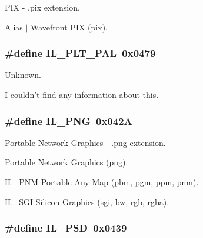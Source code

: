 P\+I\+X -\/ .pix extension. 

Alias $\vert$ Wavefront P\+I\+X (pix). \hypertarget{group__il__formats_ga2369e5911ab069d0ea3dac1ce50e9ce5}{
\subsubsection[{I\+L\+\_\+\+P\+L\+T\+\_\+\+P\+A\+L}]{\setlength{\rightskip}{0pt plus 5cm}\#define I\+L\+\_\+\+P\+L\+T\+\_\+\+P\+A\+L~0x0479}}\label{group__il__formats_ga2369e5911ab069d0ea3dac1ce50e9ce5}


Unknown. 

I couldn't find any information about this. \hypertarget{group__il__formats_ga44006e952eb70685efdb82059eca4386}{
\subsubsection[{I\+L\+\_\+\+P\+N\+G}]{\setlength{\rightskip}{0pt plus 5cm}\#define I\+L\+\_\+\+P\+N\+G~0x042\+A}}\label{group__il__formats_ga44006e952eb70685efdb82059eca4386}


Portable Network Graphics -\/ .png extension. 

Portable Network Graphics (png).

I\+L\+\_\+\+P\+N\+M Portable Any Map (pbm, pgm, ppm, pnm).

I\+L\+\_\+\+S\+G\+I Silicon Graphics (sgi, bw, rgb, rgba). \hypertarget{group__il__formats_gaf127af80b100398dc7c289538730f053}{
\subsubsection[{I\+L\+\_\+\+P\+S\+D}]{\setlength{\rightskip}{0pt plus 5cm}\#define I\+L\+\_\+\+P\+S\+D~0x0439}}\label{group__il__formats_gaf127af80b100398dc7c289538730f053}


